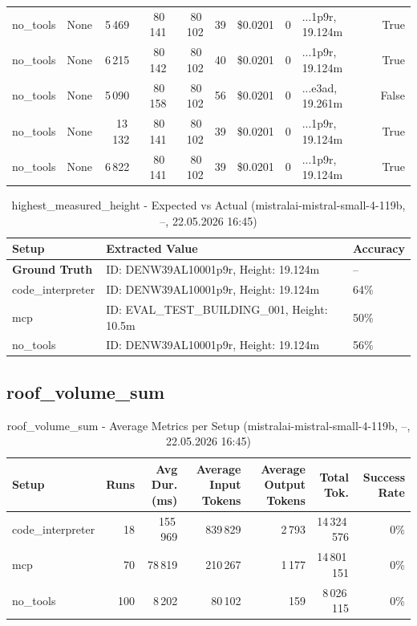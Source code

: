 \documentclass[a4paper,11pt]{article}
\begin{document}
\begin{table}[H]
{\begin{tabular}{l r r r r r r r l r}
no\_tools & None & 5\,469 & 80\,141 & 80\,102 & 39 & \$0.0201 & 0 & ...1p9r, 19.124m & True \\
no\_tools & None & 6\,215 & 80\,142 & 80\,102 & 40 & \$0.0201 & 0 & ...1p9r, 19.124m & True \\
no\_tools & None & 5\,090 & 80\,158 & 80\,102 & 56 & \$0.0201 & 0 & ...e3ad, 19.261m & False \\
no\_tools & None & 13\,132 & 80\,141 & 80\,102 & 39 & \$0.0201 & 0 & ...1p9r, 19.124m & True \\
no\_tools & None & 6\,822 & 80\,141 & 80\,102 & 39 & \$0.0201 & 0 & ...1p9r, 19.124m & True \\
\bottomrule
\end{tabular}}
\end{table}

\begin{table}[H]
\centering
\scriptsize
\caption{highest\_measured\_height - Expected vs Actual (mistralai-mistral-small-4-119b, --, 22.05.2026 16:45)}
\begin{tabular}{l l l}
\toprule
Setup & Extracted Value & Accuracy \\
\midrule
\textbf{Ground Truth} & ID: DENW39AL10001p9r, Height: 19.124m & -- \\
\midrule
code\_interpreter & ID: DENW39AL10001p9r, Height: 19.124m & 64\% \\
mcp & ID: EVAL\_TEST\_BUILDING\_001, Height: 10.5m & 50\% \\
no\_tools & ID: DENW39AL10001p9r, Height: 19.124m & 56\% \\
\bottomrule
\end{tabular}
\end{table}

\clearpage

\subsection{roof\_volume\_sum}

\begin{table}[H]
\centering
\scriptsize
\caption{roof\_volume\_sum - Average Metrics per Setup (mistralai-mistral-small-4-119b, --, 22.05.2026 16:45)}
\label{tab:combined\_roof\_volume\_sum\_metrics\_20260522}
\begin{tabular}{l r r r r r r}
\toprule
Setup & Runs & Avg Dur. (ms) & Average Input Tokens & Average Output Tokens & Total Tok. & Success Rate \\
\midrule
code\_interpreter & 18 & 155\,969 & 839\,829 & 2\,793 & 14\,324\,576 & 0\% \\
mcp & 70 & 78\,819 & 210\,267 & 1\,177 & 14\,801\,151 & 0\% \\
no\_tools & 100 & 8\,202 & 80\,102 & 159 & 8\,026\,115 & 0\% \\
\bottomrule
\end{tabular}
\end{table}
\end{document}
